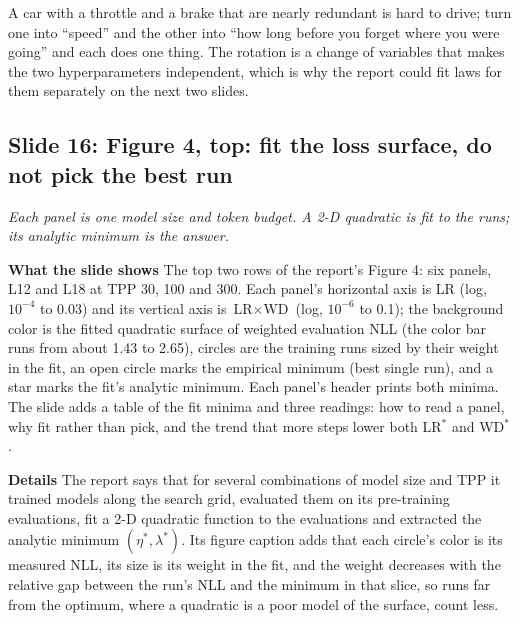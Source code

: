\documentclass[11pt,letterpaper]{article}
\newcommand{\slide}[3]{%
  \subsection[Slide #1: #2]{Slide #1: #2}%
  {\color{muted}\itshape #3\par}\medskip}
\newcommand{\para}[1]{\medskip\noindent\textbf{#1}\quad}
\newenvironment{intuition}{\begin{tcolorbox}[intuitionbox]}{\end{tcolorbox}}
\begin{document}
\begin{intuition}
A car with a throttle and a brake that are nearly redundant is hard to drive; turn one into ``speed'' and the other into ``how long before you forget where you were going'' and each does one thing. The rotation is a change of variables that makes the two hyperparameters independent, which is why the report could fit laws for them separately on the next two slides.
\end{intuition}

\slide{16}{Figure 4, top: fit the loss surface, do not pick the best run}{Each panel is one model size and token budget. A 2-D quadratic is fit to the runs; its analytic minimum is the answer.}

\para{What the slide shows} The top two rows of the report's Figure 4: six panels, L12 and L18 at TPP 30, 100 and 300. Each panel's horizontal axis is LR (log, $10^{-4}$ to 0.03) and its vertical axis is $\text{LR}\times\text{WD}$ (log, $10^{-6}$ to 0.1); the background color is the fitted quadratic surface of weighted evaluation NLL (the color bar runs from about 1.43 to 2.65), circles are the training runs sized by their weight in the fit, an open circle marks the empirical minimum (best single run), and a star marks the fit's analytic minimum. Each panel's header prints both minima. The slide adds a table of the fit minima and three readings: how to read a panel, why fit rather than pick, and the trend that more steps lower both LR$^*$ and WD$^*$.

\para{Details} The report says that for several combinations of model size and TPP it trained models along the search grid, evaluated them on its pre-training evaluations, fit a 2-D quadratic function to the evaluations and extracted the analytic minimum $(\eta^*,\lambda^*)$. Its figure caption adds that each circle's color is its measured NLL, its size is its weight in the fit, and the weight decreases with the relative gap between the run's NLL and the minimum in that slice, so runs far from the optimum, where a quadratic is a poor model of the surface, count less.
\end{document}
